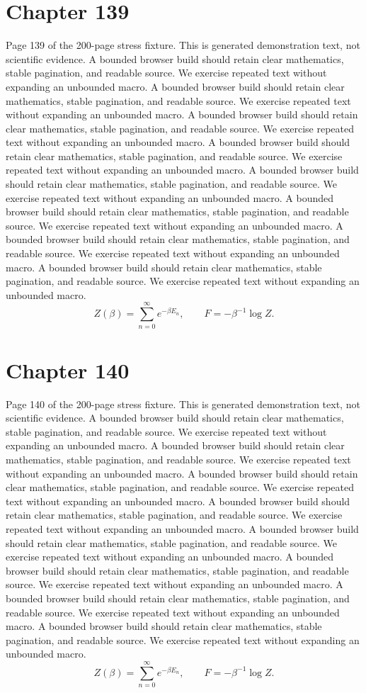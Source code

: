 \documentclass[11pt]{article}
\begin{document}
\section*{Chapter 139}
Page 139 of the 200-page stress fixture. This is generated demonstration text, not scientific evidence.
A bounded browser build should retain clear mathematics, stable pagination, and readable source. We exercise repeated text without expanding an unbounded macro.
A bounded browser build should retain clear mathematics, stable pagination, and readable source. We exercise repeated text without expanding an unbounded macro.
A bounded browser build should retain clear mathematics, stable pagination, and readable source. We exercise repeated text without expanding an unbounded macro.
A bounded browser build should retain clear mathematics, stable pagination, and readable source. We exercise repeated text without expanding an unbounded macro.
A bounded browser build should retain clear mathematics, stable pagination, and readable source. We exercise repeated text without expanding an unbounded macro.
A bounded browser build should retain clear mathematics, stable pagination, and readable source. We exercise repeated text without expanding an unbounded macro.
A bounded browser build should retain clear mathematics, stable pagination, and readable source. We exercise repeated text without expanding an unbounded macro.
A bounded browser build should retain clear mathematics, stable pagination, and readable source. We exercise repeated text without expanding an unbounded macro.
\[Z(\beta)=\sum_{n=0}^{\infty}e^{-\beta E_n},\qquad F=-\beta^{-1}\log Z.\]
\newpage
\section*{Chapter 140}
Page 140 of the 200-page stress fixture. This is generated demonstration text, not scientific evidence.
A bounded browser build should retain clear mathematics, stable pagination, and readable source. We exercise repeated text without expanding an unbounded macro.
A bounded browser build should retain clear mathematics, stable pagination, and readable source. We exercise repeated text without expanding an unbounded macro.
A bounded browser build should retain clear mathematics, stable pagination, and readable source. We exercise repeated text without expanding an unbounded macro.
A bounded browser build should retain clear mathematics, stable pagination, and readable source. We exercise repeated text without expanding an unbounded macro.
A bounded browser build should retain clear mathematics, stable pagination, and readable source. We exercise repeated text without expanding an unbounded macro.
A bounded browser build should retain clear mathematics, stable pagination, and readable source. We exercise repeated text without expanding an unbounded macro.
A bounded browser build should retain clear mathematics, stable pagination, and readable source. We exercise repeated text without expanding an unbounded macro.
A bounded browser build should retain clear mathematics, stable pagination, and readable source. We exercise repeated text without expanding an unbounded macro.
\[Z(\beta)=\sum_{n=0}^{\infty}e^{-\beta E_n},\qquad F=-\beta^{-1}\log Z.\]
\newpage
\end{document}
